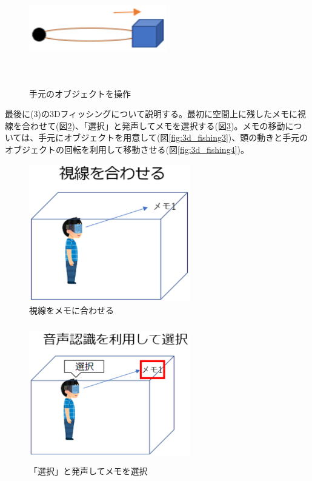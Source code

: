 \documentclass[11pt,a4j, titlepage]{jarticle} %
\begin{document}
\begin{figure}[H]
  \begin{center}
    \includegraphics[clip,height=5.0cm,width=6.0cm]{./3d_rubber_band4.eps}
    \caption{手元のオブジェクトを操作}
    \label{fig:3d_rubber_band4}
  \end{center}
\end{figure}

最後に(3)の3Dフィッシングについて説明する。最初に空間上に残したメモに視線を合わせて(図\ref{fig:3d_fishing})、「選択」と発声してメモを選択する(図\ref{fig:3d_fishing2})。メモの移動については、手元にオブジェクトを用意して(図\ref{fig:3d_fishing3})、頭の動きと手元のオブジェクトの回転を利用して移動させる(図\ref{fig:3d_fishing4})。

\begin{figure}[H]
  \begin{center}
    \includegraphics[clip,height=6.0cm,width=7.0cm]{./3d_fishing.eps}
    \caption{視線をメモに合わせる}
    \label{fig:3d_fishing}
  \end{center}
\end{figure}

\begin{figure}[H]
  \begin{center}
    \includegraphics[clip,height=6.0cm,width=7.0cm]{./3d_fishing2.eps}
    \caption{「選択」と発声してメモを選択}
    \label{fig:3d_fishing2}
  \end{center}
\end{figure}
\end{document}

